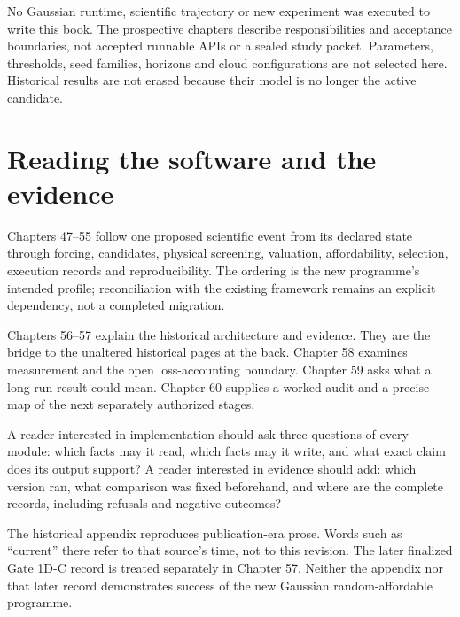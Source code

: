 No Gaussian runtime, scientific trajectory or new experiment was executed to
write this book. The prospective chapters describe responsibilities and
acceptance boundaries, not accepted runnable APIs or a sealed study packet.
Parameters, thresholds, seed families, horizons and cloud configurations are
not selected here. Historical results are not erased because their model is
no longer the active candidate.

\chapter*{Reading the software and the evidence}
Chapters 47--55 follow one proposed scientific event from its declared state
through forcing, candidates, physical screening, valuation, affordability,
selection, execution records and reproducibility. The ordering is the new
programme's intended profile; reconciliation with the existing framework
remains an explicit dependency, not a completed migration.

Chapters 56--57 explain the historical architecture and evidence. They are
the bridge to the unaltered historical pages at the back. Chapter 58 examines
measurement and the open loss-accounting boundary. Chapter 59 asks what a
long-run result could mean. Chapter 60 supplies a worked audit and a precise
map of the next separately authorized stages.

A reader interested in implementation should ask three questions of every
module: which facts may it read, which facts may it write, and what exact
claim does its output support? A reader interested in evidence should add:
which version ran, what comparison was fixed beforehand, and where are the
complete records, including refusals and negative outcomes?

The historical appendix reproduces publication-era prose. Words such as
``current'' there refer to that source's time, not to this revision. The later
finalized Gate 1D-C record is treated separately in Chapter 57. Neither the
appendix nor that later record demonstrates success of the new Gaussian
random-affordable programme.
